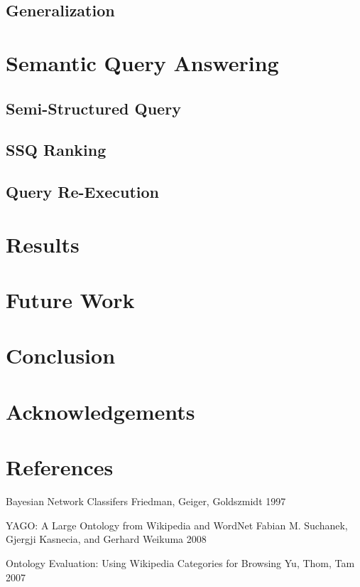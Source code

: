 \documentclass{www2010-submission}
\begin{document}
\subsection{Generalization}

\section{Semantic Query Answering}
\subsection{Semi-Structured Query}
\subsection{SSQ Ranking}
\subsection{Query Re-Execution}

\section{Results}

\section{Future Work}

\section{Conclusion}

\section{Acknowledgements}

\section{References}
Bayesian Network Classifers
Friedman, Geiger, Goldszmidt 1997

YAGO: A Large Ontology from Wikipedia and WordNet
Fabian M. Suchanek, Gjergji Kasnecia, and Gerhard Weikuma 2008

Ontology Evaluation: Using Wikipedia Categories for Browsing
Yu, Thom, Tam 2007
\end{document}
